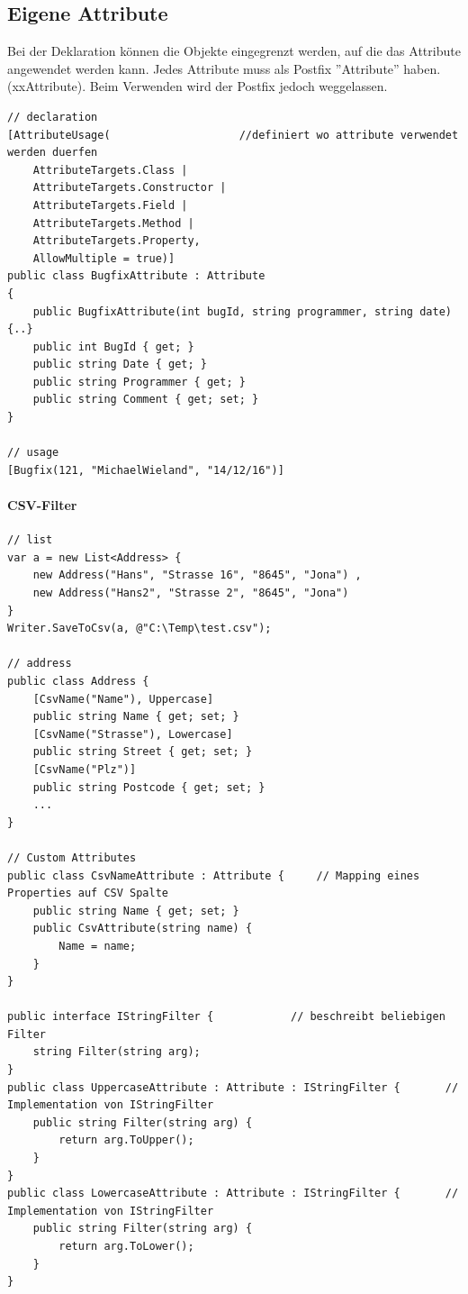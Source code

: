 \documentclass[
a4paper,
oneside,
10pt,
fleqn,
headsepline,
toc=listofnumbered, 
bibliography=totocnumbered]{scrartcl}
\begin{document}
\clearpage

\subsection{Eigene Attribute}
Bei der Deklaration können die Objekte eingegrenzt werden, auf die das Attribute angewendet werden kann. Jedes Attribute muss als Postfix ''Attribute'' haben. (xxAttribute). Beim Verwenden wird der Postfix jedoch weggelassen.
\begin{lstlisting}
// declaration 
[AttributeUsage(                    //definiert wo attribute verwendet werden duerfen
	AttributeTargets.Class |
	AttributeTargets.Constructor |
	AttributeTargets.Field |
	AttributeTargets.Method |
	AttributeTargets.Property,
	AllowMultiple = true)]
public class BugfixAttribute : Attribute
{
	public BugfixAttribute(int bugId, string programmer, string date) {..}
	public int BugId { get; }
	public string Date { get; }
	public string Programmer { get; }
	public string Comment { get; set; }
}

// usage
[Bugfix(121, "MichaelWieland", "14/12/16")]
\end{lstlisting}
\paragraph{CSV-Filter}
\begin{lstlisting}
// list
var a = new List<Address> {
	new Address("Hans", "Strasse 16", "8645", "Jona") ,
	new Address("Hans2", "Strasse 2", "8645", "Jona")
}
Writer.SaveToCsv(a, @"C:\Temp\test.csv");

// address
public class Address {
	[CsvName("Name"), Uppercase]
	public string Name { get; set; }
	[CsvName("Strasse"), Lowercase]
	public string Street { get; set; }
	[CsvName("Plz")]
	public string Postcode { get; set; }
	...
}

// Custom Attributes
public class CsvNameAttribute : Attribute {     // Mapping eines Properties auf CSV Spalte
	public string Name { get; set; }
	public CsvAttribute(string name) {
		Name = name;
	}
}

public interface IStringFilter {            // beschreibt beliebigen Filter
	string Filter(string arg); 
}
public class UppercaseAttribute : Attribute : IStringFilter {       // Implementation von IStringFilter
	public string Filter(string arg) {
		return arg.ToUpper();
	}
}
public class LowercaseAttribute : Attribute : IStringFilter {       // Implementation von IStringFilter
	public string Filter(string arg) {
		return arg.ToLower();
	}
}
\end{lstlisting}
\end{document}
